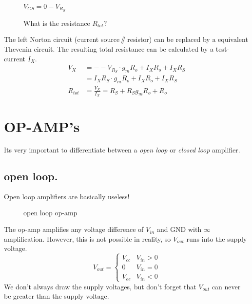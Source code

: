 \documentclass[11ypt]{extarticle}
\newcommand{\parallelEE}{\mathbin{\!/\mkern-5mu/\!}} %
\begin{document}
\begin{figure}[H]{}
    \centering
	
\caption{What is the resistance $R_{tot}$?}
$V_{GS} = 0 - V_{R_S}$
\end{figure}

The left Norton circuit (current source $\parallelEE$ resistor) can be replaced by a equivalent Thevenin circuit. The resulting total resistance can be calculated by a test-current $I_X$.
\begin{equation}
\begin{aligned}
    V_X &= --V_{R_S} \cdot g_m R_{o} + I_X R_{o} + I_X R_S
    \\
    &=I_X R_S \cdot g_m R_{o} + I_X R_{o} + I_X R_S 
    \\
    R_{tot} &= \frac{V_X}{I_X} = R_S + R_S g_m R_{o} + R_{o}
\end{aligned}
\end{equation}

\section{OP-AMP's}

Its very important to differentiate between a \textit{open loop} or \textit{closed loop} amplifier.

\subsection{open loop.}

Open loop amplifiers are basically useless!

\begin{figure}[H]{} 
    \centering
    
    \caption{open loop op-amp}
\end{figure}

The op-amp amplifies any voltage difference of $V_{in}$ and GND with $\infty$ amplification. However, this is not possible in reality, so $V_{out}$ runs into the supply voltage.
\begin{equation}
    V_{out} = 
    \begin{cases}
        {V_{cc}} & {V_{in} > 0} \\
        0     & {V_{in} = 0} \\
        {V_{ee}} & {V_{in} < 0}
    \end{cases}      
\end{equation}
We don't always draw the supply voltages, but don't forget that $V_{out}$ can never be greater than the supply voltage.
\end{document}
